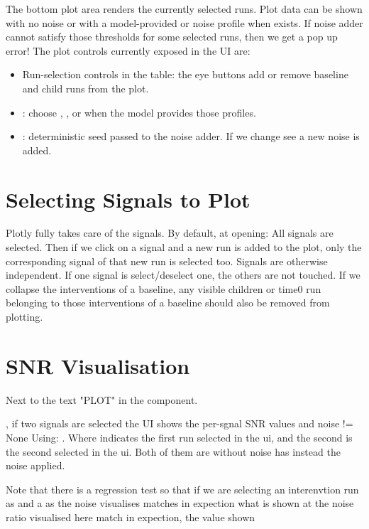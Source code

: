 \documentclass[11pt]{article}
\begin{document}
The bottom plot area renders the currently selected runs. 
Plot data can be shown with no noise or with a model-provided  or  noise profile when  exists.
If noise adder cannot satisfy those thresholds for some selected runs, then we get a pop up error!
The plot controls currently exposed in the UI are:


\begin{itemize}
\item Run-selection controls in the table: the eye buttons add or remove baseline and child runs from the plot.
\item {}: choose , , or  when the model provides those profiles.
\item {}: deterministic seed passed to the noise adder. If we change see a new noise is added.
\end{itemize}

\section*{Selecting Signals to Plot}
Plotly fully takes care of the signals.
By default, at opening: All signals are selected.
Then if we click on a signal and a new run is added to the plot, only the corresponding signal of that new run is selected too.
Signals are otherwise independent. If one signal is select/deselect one, the others are not touched.
If we collapse the interventions of a baseline, any visible children or time0 run belonging to those interventions of a baseline should also be removed from plotting.

\section*{SNR Visualisation}
Next to the text "PLOT" in the  component.

, if two signals are selected the UI shows the per-sgnal SNR values and noise != None
Using: . 
Where  indicates the first run selected in the ui, and  the second is the second selected in the ui. Both of them are without noise
 has instead the noise applied.

Note that there is a regression test so that if we are selecting an interenvtion run as  and a  as  the noise visualises matches in expection what is shown at the noise ratio visualised here match in expection, the value shown 
\end{document}
